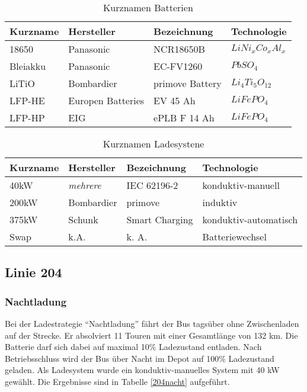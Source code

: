\begin{table}\centering
	\begin{tabularx}{\textwidth}{XXXl}
		\toprule
		Kurzname & Hersteller        & Bezeichnung     & Technologie      \\ \midrule
		18650    & Panasonic         & NCR18650B       & $LiNi_xCo_xAl_x$ \\
		Bleiakku & Panasonic         & EC-FV1260       & $PbSO_4$         \\
		LiTiO    & Bombardier        & primove Battery & $Li_4Ti_5O_{12}$ \\
		LFP-HE   & Europen Batteries & EV 45 Ah        & $LiFePO_4$       \\
		LFP-HP   & EIG               & ePLB F 14 Ah    & $LiFePO_4$       \\ \bottomrule
	\end{tabularx}
	\caption{Kurznamen Batterien}
	\label{batNamen}
\end{table}

\begin{table}\centering
	\begin{tabularx}{\textwidth}{XXXl}
		\toprule
		Kurzname & Hersteller        & Bezeichnung     & Technologie      \\ \midrule
		40kW    & \emph{mehrere}         & IEC 62196-2       & konduktiv-manuell \\
		200kW & Bombardier         & primove       & induktiv         \\
		375kW    & Schunk        & Smart Charging & konduktiv-automatisch \\
		Swap   & k.A.  & k. A.       & Batteriewechsel    \\ \bottomrule
	\end{tabularx}
	\caption{Kurznamen Ladesystene}
	\label{ladeNamen}
\end{table}

\subsection{Linie 204}
\subsubsection{Nachtladung}
\label{erkl204nacht}
Bei der Ladestrategie "`Nachtladung"' fährt der Bus tagsüber ohne Zwischenladen auf der Strecke. Er absolviert 11 Touren mit einer Gesamtlänge von 132 km. Die Batterie darf sich dabei auf maximal 10\% Ladezustand entladen. Nach Betriebsschluss wird der Bus über Nacht im Depot auf 100\% Ladezustand geladen. Als Ladesystem wurde ein konduktiv-manuelles System mit 40 kW gewählt. Die Ergebnisse sind in Tabelle \ref{204nacht} aufgeführt.

